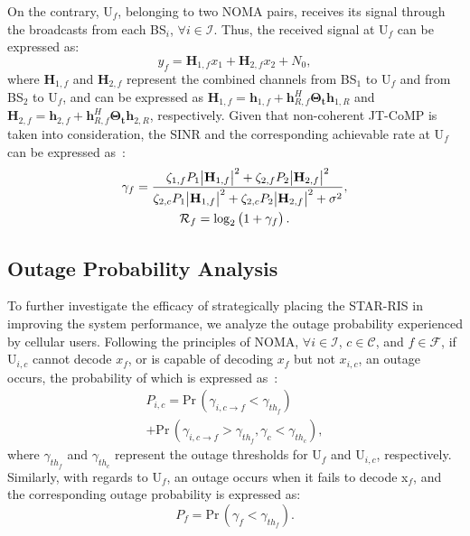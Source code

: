 \documentclass[conference]{IEEEtran}
\begin{document}
On the contrary, U$_f$, belonging to two NOMA pairs, receives its signal through the broadcasts from each BS$_i$, $\forall i \in \mathcal{I}$. Thus, the received signal at U$_f$ can be expressed as:
\begin{equation}
    y_f = \textbf{H}_{1, f}x_1 + \textbf{H}_{2, f}x_2 + N_0,
\end{equation}
where $\textbf{H}_{1, f}$ and $\textbf{H}_{2, f}$ represent the combined channels from BS$_1$ to U$_f$ and from BS$_2$ to U$_f$, and can be expressed as $\textbf{H}_{1, f}=\textbf{h}_{1, f}+\textbf{h}_{R, f}^H \mathbf{\Theta_t}\textbf{h}_{1, R}$ and $\textbf{H}_{2, f}=\textbf{h}_{2, f}+\textbf{h}_{R, f}^H \mathbf{\Theta_t}\textbf{h}_{2, R}$, respectively. Given that non-coherent JT-CoMP is taken into consideration, the SINR and the corresponding achievable rate at U$_f$ can be expressed as~\cite{tanbourgi2014tractable, elhattab2022ris}:
\begin{gather}
    \gamma_{f}=\frac{\zeta_{1,f}P_1\abs{\textbf{H}_{1, f}}^2 + \zeta_{2,f}P_2\abs{\textbf{H}_{2, f}}^2}{\zeta_{2,c}P_1\abs{\textbf{H}_{1, f}}^2 + \zeta_{2,c}P_2\abs{\textbf{H}_{2, f}}^2 + \sigma^2}, \\
    \mathcal{R}_{f}=\log_2\left(1 + \gamma_f\right).
\end{gather}


\subsection{Outage Probability Analysis}
To further investigate the efficacy of strategically placing the STAR-RIS in improving the system performance, we analyze the outage probability experienced by cellular users. Following the principles of NOMA, $\forall i \in \mathcal{I}$, $c \in \mathcal{C}$, and $f \in \mathcal{F}$, if U$_{i,c}$ cannot decode $x_f$, or is capable of decoding $x_f$ but not $x_{i,c}$, an outage occurs, the probability of which is expressed as~\cite{9856598}:
\begin{multline}
    P_{i,c} = \text{Pr}\,(\gamma_{i,c \rightarrow f} < \gamma_{th_f}) \\ + \text{Pr}\,(\gamma_{i,c \rightarrow f} > \gamma_{th_f}, \gamma_{c} < \gamma_{th_{c}}),
\end{multline}
where $\gamma_{th_f}$ and $\gamma_{th_{c}}$ represent the outage thresholds for U$_f$ and U$_{i,c}$, respectively. Similarly, with regards to U$_f$, an outage occurs when it fails to decode x$_f$, and the corresponding outage probability is expressed as:
\begin{equation}
    P_{f}=\text{Pr}\,(\gamma_{f}<\gamma_{th_f}).
\end{equation}
\end{document}
